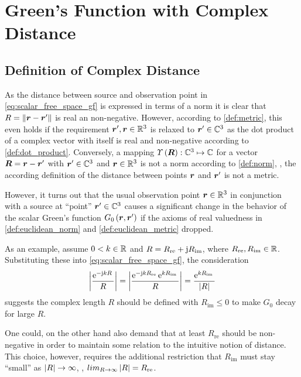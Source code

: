 \section{Green's Function with Complex Distance}
\label{sec:greens_function_cmplx_src_pts}






\subsection{Definition of Complex Distance}
\label{subsec:def_cmplx_distance}

As the distance between source and observation point in
\eqref{eq:scalar_free_space_gf} is expressed in terms of a norm
it is clear that $\rdiffNormSymbol = \rdiffNorm$ is real an non-negative.
However, according to \cref{def:metric}, this even
holds if the requirement $\rsrc, \robs \in \R^3$ is relaxed to
$\rsrc \in \C^3$ as the dot product of a complex vector with itself
is real and non-negative according to \cref{def:dot_product}.
Conversely, a mapping $\cmplxlength{\rdiffSymbol}: \C^3 \mapsto \C$ for a vector
$\rdiffSymbol = \rdiff$ with $\rsrc\in \C^3$ and $\robs \in \R^3$ is not a norm
according to \cref{def:norm}, \ie, the according definition of the distance
between points $\robs$ and $\rsrc$ is not a metric.

However, it turns out that the usual observation point $\robs \in \R^3$ 
in conjunction with a source at \enquote{point} $\rsrc \in \C^3$
causes a significant change in the behavior of the scalar Green's function
$G_0 \left(\robs, \rsrc\right)$ if the axioms of real valuedness in
\cref{def:euclidean_norm} and \cref{def:euclidean_metric} dropped.

As an example, assume $0 < k \in \mathbb{R}$ and
$R = R_\mathrm{re} + \mathrm{j} R_\mathrm{im}$, where
$R_\mathrm{re}, R_\mathrm{im} \in \mathbb{R}$.
Substituting these into \eqref{eq:scalar_free_space_gf}, the consideration
\begin{equation}\label{eq:example_csb}
	\left\vert\frac{\mathrm{e}^{-\mathrm{j} k R}\,}{R}\right\vert = 
	\left\vert \frac{\mathrm{e}^{-\mathrm{j} k R_\mathrm{re}}\, \mathrm{e}^{k R_\mathrm{im}}\,}{R} \right\vert = 
	\frac{\mathrm{e}^{k R_\mathrm{im}}\,}{\left\vert R\right\vert}
\end{equation}
suggests the complex length $R$ should be defined with $R_\mathrm{im} \leq 0$ to
make $G_0$ decay for large $R$.

One could, on the other hand also demand that at least $R_\mathrm{re}$ should be
non-negative in order to maintain some relation to the intuitive notion of
distance.
This choice, however, requires the additional restriction that $R_\mathrm{im}$
must stay \enquote{small} as $\left\vert R\right\vert \to \infty$, \ie,
$lim_{R \to \infty} \left\vert R\right\vert = R_\mathrm{re}$.

